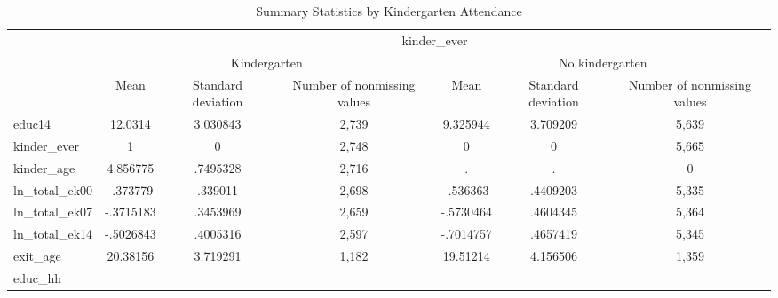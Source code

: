 \begin{table}[!h]
\caption{Summary Statistics by Kindergarten Attendance}
\begin{tabular}{lllllll}
\cline{1-7}
\multicolumn{1}{c}{} &
  \multicolumn{6}{|c}{kinder\_ever} \\
\multicolumn{1}{c}{} &
  \multicolumn{3}{|c}{Kindergarten} &
  \multicolumn{3}{c}{No kindergarten} \\
\multicolumn{1}{c}{} &
  \multicolumn{1}{|c}{Mean} &
  \multicolumn{1}{c}{Standard deviation} &
  \multicolumn{1}{c}{Number of nonmissing values} &
  \multicolumn{1}{c}{Mean} &
  \multicolumn{1}{c}{Standard deviation} &
  \multicolumn{1}{c}{Number of nonmissing values} \\
\cline{1-7}
\multicolumn{1}{l}{educ14} &
  \multicolumn{1}{|c}{12.0314} &
  \multicolumn{1}{c}{3.030843} &
  \multicolumn{1}{c}{2,739} &
  \multicolumn{1}{c}{9.325944} &
  \multicolumn{1}{c}{3.709209} &
  \multicolumn{1}{c}{5,639} \\
\multicolumn{1}{l}{kinder\_ever} &
  \multicolumn{1}{|c}{1} &
  \multicolumn{1}{c}{0} &
  \multicolumn{1}{c}{2,748} &
  \multicolumn{1}{c}{0} &
  \multicolumn{1}{c}{0} &
  \multicolumn{1}{c}{5,665} \\
\multicolumn{1}{l}{kinder\_age} &
  \multicolumn{1}{|c}{4.856775} &
  \multicolumn{1}{c}{.7495328} &
  \multicolumn{1}{c}{2,716} &
  \multicolumn{1}{c}{.} &
  \multicolumn{1}{c}{.} &
  \multicolumn{1}{c}{0} \\
\multicolumn{1}{l}{ln\_total\_ek00} &
  \multicolumn{1}{|c}{-.373779} &
  \multicolumn{1}{c}{.339011} &
  \multicolumn{1}{c}{2,698} &
  \multicolumn{1}{c}{-.536363} &
  \multicolumn{1}{c}{.4409203} &
  \multicolumn{1}{c}{5,335} \\
\multicolumn{1}{l}{ln\_total\_ek07} &
  \multicolumn{1}{|c}{-.3715183} &
  \multicolumn{1}{c}{.3453969} &
  \multicolumn{1}{c}{2,659} &
  \multicolumn{1}{c}{-.5730464} &
  \multicolumn{1}{c}{.4604345} &
  \multicolumn{1}{c}{5,364} \\
\multicolumn{1}{l}{ln\_total\_ek14} &
  \multicolumn{1}{|c}{-.5026843} &
  \multicolumn{1}{c}{.4005316} &
  \multicolumn{1}{c}{2,597} &
  \multicolumn{1}{c}{-.7014757} &
  \multicolumn{1}{c}{.4657419} &
  \multicolumn{1}{c}{5,345} \\
\multicolumn{1}{l}{exit\_age} &
  \multicolumn{1}{|c}{20.38156} &
  \multicolumn{1}{c}{3.719291} &
  \multicolumn{1}{c}{1,182} &
  \multicolumn{1}{c}{19.51214} &
  \multicolumn{1}{c}{4.156506} &
  \multicolumn{1}{c}{1,359} \\
\multicolumn{1}{l}{educ\_hh} &

\end{tabular}
\end{table}
